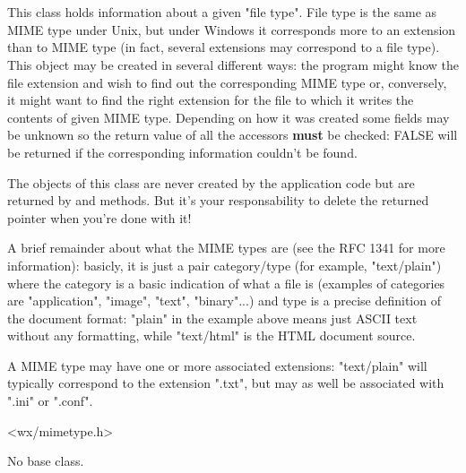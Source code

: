 \section{}\label{wxfiletype}

This class holds information about a given "file type". File type is the same as
MIME type under Unix, but under Windows it corresponds more to an extension than
to MIME type (in fact, several extensions may correspond to a file type). This
object may be created in several different ways: the program might know the file
extension and wish to find out the corresponding MIME type or, conversely, it
might want to find the right extension for the file to which it writes the
contents of given MIME type. Depending on how it was created some fields may be
unknown so the return value of all the accessors {\bf must} be checked: FALSE
will be returned if the corresponding information couldn't be found.

The objects of this class are never created by the application code but are
returned by  and 
 methods.
But it's your responsability to delete the returned pointer when you're done
with it!

A brief remainder about what the MIME types are (see the RFC 1341 for more
information): basicly, it is just a pair category/type (for example,
"text/plain") where the category is a basic indication of what a file is
(examples of categories are "application", "image", "text", "binary"...) and
type is a precise definition of the document format: "plain" in the example
above means just ASCII text without any formatting, while "text/html" is the
HTML document source.

A MIME type may have one or more associated extensions: "text/plain" will
typically correspond to the extension ".txt", but may as well be associated with
".ini" or ".conf".


<wx/mimetype.h>


No base class.




